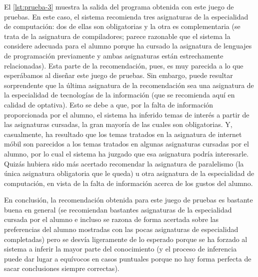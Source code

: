 El \autoref{lst:prueba-3} muestra la salida del programa obtenida con este 
juego de pruebas. En este caso, el sistema recomienda tres asignaturas de la 
especialidad de computación: dos de ellas son obligatorias y la otra es 
complementaria (se trata de la asignatura de compiladores; parece razonable 
que el sistema la considere adecuada para el alumno porque ha cursado la 
asignatura de lenguajes de programación previamente y ambas asignaturas están 
estrechamente relacionadas). Esta parte de la recomendación, pues, es muy 
parecida a lo que esperábamos al diseñar este juego de pruebas. Sin embargo, 
puede resultar sorprendente que la última asignatura de la recomendación sea 
una asignatura de la especialidad de tecnologías de la información (que se 
recomienda aquí en calidad de optativa). Esto se debe a que, por la falta de 
información proporcionada por el alumno, el sistema ha inferido temas de 
interés a partir de las asignaturas cursadas, la gran mayoría de las cuales 
son obligatorias. Y, casualmente, ha resultado que los temas tratados en la 
asignatura de internet móbil son parecidos a los temas tratados en algunas 
asignaturas cursadas por el alumno, por lo cual el sistema ha juzgado que 
esa asignatura podría interesarle. Quizás hubiera sido más acertado recomendar
la asignatura de paralelismo (la única asignatura obligatoria que le queda) 
u otra asignatura de la especialidad de computación, en vista de la falta de 
información acerca de los gustos del alumno.

En conclusión, la recomendación obtenida para este juego de pruebas es 
bastante buena en general (se recomiendan bastantes asignaturas de la 
especialidad cursada por el alumno e incluso se razona de forma acertada 
sobre las preferencias del alumno mostradas con las pocas asignaturas de 
especialidad completadas) pero se desvía ligeramente de lo esperado porque se 
ha forzado al sistema a inferir la mayor parte del conocimiento (y el proceso 
de inferencia puede dar lugar a equívocos en casos puntuales porque no hay 
forma perfecta de sacar conclusiones siempre correctas). 


